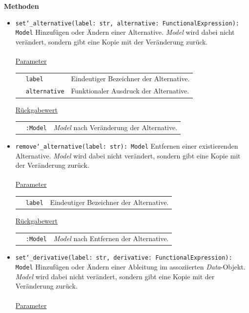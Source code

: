 \documentclass{article}
\begin{document}
\textbf{{Methoden}}
\begin{itemize}
\item \texttt{set\char`_alternative(label: str, alternative: FunctionalExpression): Model} \newline Hinzufügen oder Ändern einer Alternative. \textit{Model} wird dabei nicht verändert, sondern gibt eine Kopie mit der Veränderung zurück.
\\\\
\underline{{Parameter}}

\begin{tabular}{lll}
 & \texttt{label} & Eindeutiger Bezeichner der Alternative. \\
 & \texttt{alternative} & Funktionaler Ausdruck der Alternative. \\
\end{tabular}

\underline{{Rückgabewert}}

\begin{tabular}{lll}
 & \texttt{:Model} & \textit{Model} nach Veränderung der Alternative. \\
\end{tabular}


\item \texttt{remove\char`_alternative(label: str): Model} \newline Entfernen einer existierenden Alternative. \textit{Model} wird dabei nicht verändert, sondern gibt eine Kopie mit der Veränderung zurück.
\\\\
\underline{{Parameter}}

\begin{tabular}{lll}
 & \texttt{label} & Eindeutiger Bezeichner der Alternative. \\
\end{tabular}

\underline{{Rückgabewert}}

\begin{tabular}{lll}
 & \texttt{:Model} & \textit{Model} nach Entfernen der Alternative. \\
\end{tabular}


\item \texttt{set\char`_derivative(label: str, derivative: FunctionalExpression): Model} \newline Hinzufügen oder Ändern einer Ableitung im assoziierten \textit{Data}-Objekt. \textit{Model} wird dabei nicht verändert, sondern gibt eine Kopie mit der Veränderung zurück.
\\\\
\underline{{Parameter}}


\end{itemize}
\end{document}
